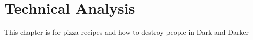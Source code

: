 \chapter{Technical Analysis} \label{ch:TechnicalAnalysis}
This chapter is for pizza recipes and how to destroy people in Dark and Darker


